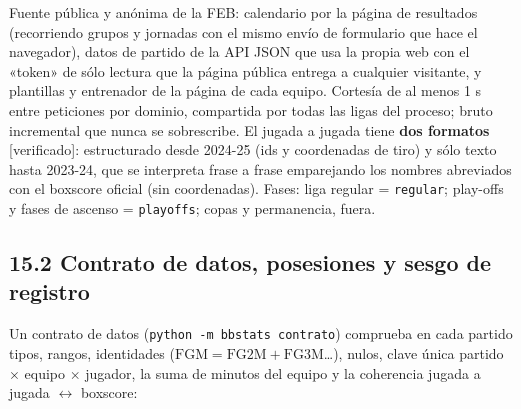\documentclass[10pt,a4paper]{article}
\begin{document}
Fuente pública y anónima de la FEB: calendario por la página de resultados (recorriendo grupos y jornadas con el mismo envío de formulario que hace el navegador), datos de partido de la API JSON que usa la propia web con el «token» de sólo lectura que la página pública entrega a cualquier visitante, y plantillas y entrenador de la página de cada equipo. Cortesía de al menos 1 s entre peticiones por dominio, compartida por todas las ligas del proceso; bruto incremental que nunca se sobrescribe. El jugada a jugada tiene \textbf{dos formatos} [verificado]: estructurado desde 2024-25 (ids y coordenadas de tiro) y sólo texto hasta 2023-24, que se interpreta frase a frase emparejando los nombres abreviados con el boxscore oficial (sin coordenadas). Fases: liga regular = \texttt{regular}; play-offs y fases de ascenso = \texttt{playoffs}; copas y permanencia, fuera.

\begin{center}\small
{}
\end{center}
\subsection*{15.2 Contrato de datos, posesiones y sesgo de registro}
Un contrato de datos (\texttt{python -m bbstats contrato}) comprueba en cada partido tipos, rangos, identidades ($\mathrm{FGM}=\mathrm{FG2M}+\mathrm{FG3M}$\ldots{}), nulos, clave única partido \ensuremath{\times} equipo \ensuremath{\times} jugador, la suma de minutos del equipo y la coherencia jugada a jugada \ensuremath{\leftrightarrow} boxscore:
\end{document}
